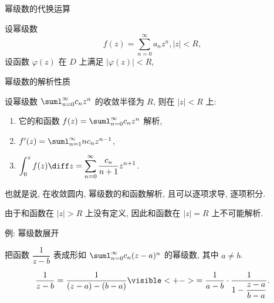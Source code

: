 \begin{frame}{幂级数的代换运算}
	\onslide<+->
	\begin{theorem}
		设幂级数
	\[
		f(z)=\sum_{n=0}^\infty a_nz^n,|z|<R,
	\]
		设函数 $\varphi(z)$ 在 $D$ 上满足 $|\varphi(z)|<R$, 
		\onslide<+->{%
		那么当 $z\in D$ 时,
	\[
		f\bigl(\varphi(z)\bigr)\sum_{n=0}^\infty a_n\bigl(\varphi(z)\bigr)^n.
	\]
		}
	\end{theorem}
\end{frame}


\begin{frame}{幂级数的解析性质}
	\onslide<+->
	\begin{theorem}
		设幂级数 $\suml_{n=0}^\infty c_nz^n$ 的收敛半径为 $R$, 则在 $|z|<R$ 上:
		\begin{enumerate}
			\item 它的和函数 $f(z)=\suml_{n=0}^\infty c_nz^n$ 解析,
			\item $f'(z)=\suml_{n=1}^\infty nc_nz^{n-1}$,
			\item $\displaystyle\int_0^zf(z)\diff z=\sum_{n=0}^\infty \frac{c_n}{n+1}z^{n+1}$.
		\end{enumerate}
	\end{theorem}

	\onslide<+->
	也就是说, \alert{在收敛圆内, 幂级数的和函数解析, 且可以逐项求导, 逐项积分}.

	\onslide<+->
	由于和函数在 $|z|>R$ 上没有定义, 因此和函数在 $|z|=R$ 上不可能解析.
\end{frame}


\begin{frame}{例: 幂级数展开}
	\onslide<+->
	\begin{example}
		把函数 $\dfrac1{z-b}$ 表成形如 $\suml_{n=0}^\infty c_n(z-a)^n$ 的幂级数, 其中 $a\neq b$.
	\end{example}

	\onslide<+->
	\begin{solution}
	\[
		\frac1{z-b}=\frac1{(z-a)-(b-a)}
		\visible<+->{=\frac1{a-b}\cdot\frac1{1-\dfrac{z-a}{b-a}}.}
	\]
		\onslide<+->{即
	\[
		\frac1{z-b}=-\sum_{n=0}^\infty\frac{(z-a)^n}{(b-a)^{n+1}},\quad|z-a|<|b-a|.\]}
		\vspace{-.5\baselineskip}
	\end{solution}
\end{frame}


